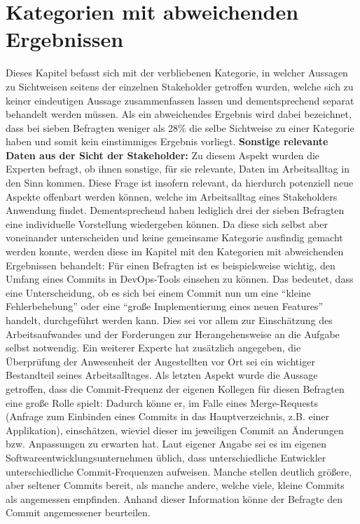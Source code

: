 \section{Kategorien mit abweichenden Ergebnissen} \label{noclearresult}
Dieses Kapitel befasst sich mit der verbliebenen Kategorie, in welcher Aussagen zu Sichtweisen seitens der einzelnen Stakeholder getroffen wurden, welche sich zu keiner eindeutigen Aussage zusammenfassen lassen und dementsprechend separat 
behandelt werden müssen. Als ein abweichendes Ergebnis wird dabei bezeichnet, dass bei sieben Befragten weniger als 28\% die selbe Sichtweise zu einer Kategorie haben und somit kein einstimmiges Ergebnis vorliegt. \newline \newline
\textbf{Sonstige relevante Daten aus der Sicht der Stakeholder:} \newline
Zu diesem Aspekt wurden die Experten befragt, ob ihnen sonstige, für sie relevante, Daten im Arbeitsalltag in den Sinn kommen. Diese Frage ist insofern relevant, da hierdurch potenziell neue Aspekte offenbart werden können, welche im Arbeitsalltag eines Stakeholders Anwendung findet. Dementsprechend
haben lediglich drei der sieben Befragten eine individuelle Vorstellung wiedergeben können. Da diese sich selbst aber voneinander unterscheiden und keine gemeinsame Kategorie ausfindig gemacht werden konnte, werden diese im Kapitel mit den Kategorien mit abweichenden Ergebnissen behandelt: Für einen Befragten ist es beispielsweise wichtig, den Umfang eines Commits in DevOps-Tools einsehen zu können. Das bedeutet, dass eine Unterscheidung, ob es sich bei einem Commit nun um eine \enquote{kleine Fehlerbehebung}
oder eine \enquote{große Implementierung eines neuen Features} handelt, durchgeführt werden kann. Dies sei vor allem zur Einschätzung des Arbeitsaufwandes und der Forderungen zur Herangehensweise an die Aufgabe selbst notwendig. \newline
Ein weiterer Experte hat zusätzlich angegeben, die Überprüfung der Anwesenheit der Angestellten vor Ort sei ein wichtiger Bestandteil seines Arbeitsalltages. Als letzten Aspekt wurde die Aussage getroffen, dass die Commit-Frequenz der eigenen Kollegen für diesen Befragten eine große Rolle spielt: Dadurch könne er, im Falle eines Merge-Requests (Anfrage zum Einbinden eines Commits in das Hauptverzeichnis, z.B. einer Applikation), einschätzen, wieviel dieser im jeweiligen Commit an Änderungen bzw. Anpassungen zu erwarten hat.
Laut eigener Angabe sei es im eigenen Softwareentwicklungsunternehmen üblich, dass unterschiedliche Entwickler unterschiedliche Commit-Frequenzen aufweisen. Manche stellen deutlich größere, aber seltener Commits bereit, als manche andere, welche viele, kleine Commits als angemessen empfinden. Anhand dieser Information könne der Befragte den Commit angemessener beurteilen.

